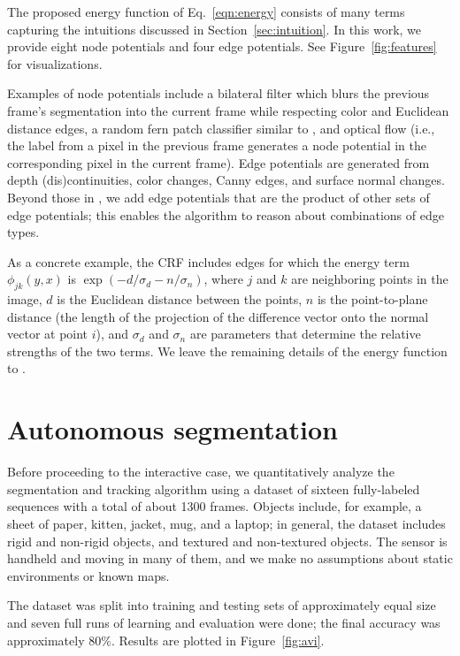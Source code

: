 \documentclass[conference]{IEEEtran}
\begin{document}
The proposed energy function of Eq.~\ref{eqn:energy} consists of many terms capturing the intuitions discussed in Section~\ref{sec:intuition}.  In this work, we provide eight node potentials and four edge potentials.  See Figure~\ref{fig:features} for visualizations.

Examples of node potentials include a bilateral filter which blurs the previous frame's segmentation into the current frame while respecting color and Euclidean distance edges, a random fern patch classifier similar to \cite{ozuysal2007a}, and optical flow (i.e., the label from a pixel in the previous frame generates a node potential in the corresponding pixel in the current frame).  Edge potentials are generated from depth (dis)continuities, color changes, Canny edges, and surface normal changes.  Beyond those in \cite{teichman2012a}, we add edge potentials that are the product of other sets of edge potentials; this enables the algorithm to reason about combinations of edge types.

As a concrete example, the CRF includes edges for which the energy term $\phi_{jk}(y, x)$ is $\exp(-d / \sigma_d - n / \sigma_n)$, where $j$ and $k$ are neighboring points in the image, $d$ is the Euclidean distance between the points, $n$ is the point-to-plane distance (\ie the length of the projection of the difference vector onto the normal vector at point $i$), and $\sigma_d$ and $\sigma_n$ are parameters that determine the relative strengths of the two terms.  We leave the remaining details of the energy function to \cite{teichman2012a}.


\section{Autonomous segmentation}

Before proceeding to the interactive case, we quantitatively analyze the segmentation and tracking algorithm using a dataset of sixteen fully-labeled sequences with a total of about 1300 frames.  Objects include, for example, a sheet of paper, kitten, jacket, mug, and a laptop; in general, the dataset includes rigid and non-rigid objects, and textured and non-textured objects.  The sensor is handheld and moving in many of them, and we make no assumptions about static environments or known maps.

The dataset was split into training and testing sets of approximately equal size and seven full runs of learning and evaluation were done; the final accuracy was approximately 80\%.  Results are plotted in Figure~\ref{fig:avi}.
\end{document}

